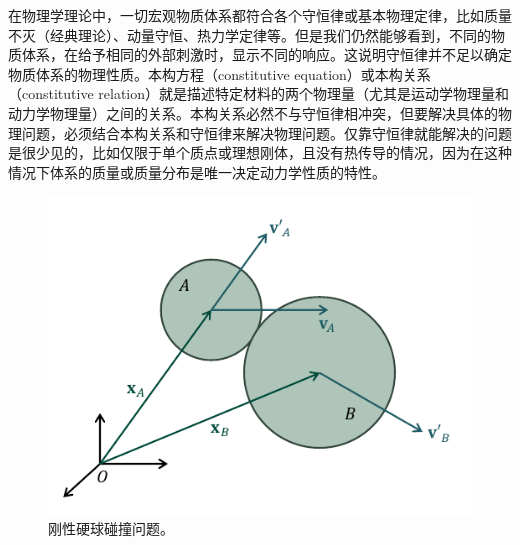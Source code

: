 \documentclass[main.tex]{subfiles}
\begin{document}
在物理学理论中，一切宏观物质体系都符合各个守恒律或基本物理定律，比如质量不灭（经典理论）、动量守恒、热力学定律等。但是我们仍然能够看到，不同的物质体系，在给予相同的外部刺激时，显示不同的响应。这说明守恒律并不足以确定物质体系的物理性质。本构方程（constitutive equation）或本构关系（constitutive relation）就是描述特定材料的两个物理量（尤其是运动学物理量和动力学物理量）之间的关系。本构关系必然不与守恒律相冲突，但要解决具体的物理问题，必须结合本构关系和守恒律来解决物理问题。仅靠守恒律就能解决的问题是很少见的，比如仅限于单个质点或理想刚体，且没有热传导的情况，因为在这种情况下体系的质量或质量分布是唯一决定动力学性质的特性。

\begin{figure}[ht]
    \centering
    \includegraphics{images/I.1.1.pdf}
    \caption{刚性硬球碰撞问题。}
    \label{fig:I.1.1}
\end{figure}
\end{document}
